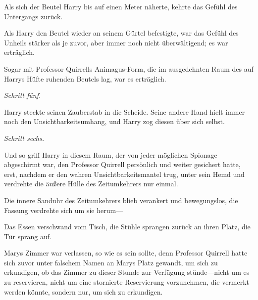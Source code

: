 Als sich der Beutel Harry bis auf einen Meter näherte, kehrte das Gefühl des Untergangs zurück.

Als Harry den Beutel wieder an seinem Gürtel befestigte, war das Gefühl des Unheils stärker als je zuvor, aber immer noch nicht überwältigend; es war erträglich.

Sogar mit Professor Quirrells Animagus-Form, die im ausgedehnten Raum des auf Harrys Hüfte ruhenden Beutels lag, war es erträglich.

\emph{Schritt fünf.}

Harry steckte seinen Zauberstab in die Scheide. Seine andere Hand hielt immer noch den Unsichtbarkeitsumhang, und Harry zog diesen über sich selbst.

\emph{Schritt sechs.}

Und so griff Harry in diesem Raum, der von jeder möglichen Spionage abgeschirmt war, den Professor Quirrell persönlich und weiter gesichert hatte, erst, nachdem er den wahren Unsichtbarkeitsmantel trug, unter sein Hemd und verdrehte die äußere Hülle des Zeitumkehrers nur einmal.

Die innere Sanduhr des Zeitumkehrers blieb verankert und bewegungslos, die Fassung verdrehte sich um sie herum—

Das Essen verschwand vom Tisch, die Stühle sprangen zurück an ihren Platz, die Tür sprang auf.

Marys Zimmer war verlassen, so wie es sein sollte, denn Professor Quirrell hatte sich zuvor unter falschem Namen an Marys Platz gewandt, um sich zu erkundigen, ob das Zimmer zu dieser Stunde zur Verfügung stünde—nicht um es zu reservieren, nicht um eine stornierte Reservierung vorzunehmen, die vermerkt werden könnte, sondern nur, um sich zu erkundigen.

